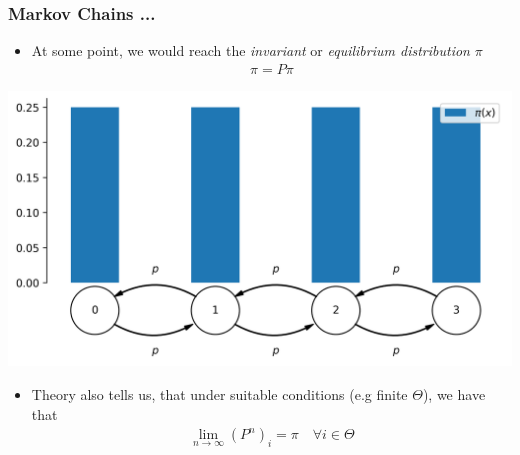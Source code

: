 \begin{frame}[c]
    \frametitle{Markov Chains ...}
    \begin{itemize}
        \item At some point, we would reach the \emph{invariant} or \emph{equilibrium distribution} $\pi$
            \begin{align*}
                \pi = P \pi
            \end{align*}
    \end{itemize}
    \vspace{-0.5cm}
    \begin{center}
        \includegraphics[scale=0.5]{imgs/uniformchaindistribution.png}
    \end{center}
    \vspace{-0.3cm}
    \begin{itemize}
        \item Theory also tells us, that under suitable conditions (e.g finite $\Theta$), we have that
            \vspace{-0.1cm}
            \begin{align*}
                \lim_{n\to \infty} (P^n)_i = \pi \quad \forall i \in \Theta
            \end{align*}
    \end{itemize}
\end{frame}

